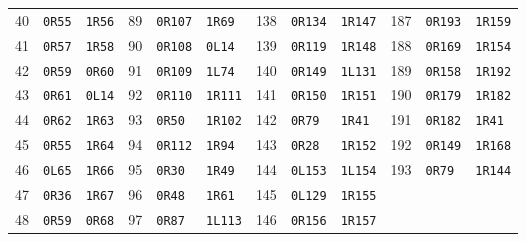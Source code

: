 \begin{center}
\begin{tabular}{@{}rll@{\qquad}rll@{\qquad}rll@{\qquad}rll@{}}
40 & \texttt{0R55} & \texttt{1R56} & 89 & \texttt{0R107} & \texttt{1R69} & 138 & \texttt{0R134} & \texttt{1R147} & 187 & \texttt{0R193} & \texttt{1R159}\\
41 & \texttt{0R57} & \texttt{1R58} & 90 & \texttt{0R108} & \texttt{0L14} & 139 & \texttt{0R119} & \texttt{1R148} & 188 & \texttt{0R169} & \texttt{1R154}\\
42 & \texttt{0R59} & \texttt{0R60} & 91 & \texttt{0R109} & \texttt{1L74} & 140 & \texttt{0R149} & \texttt{1L131} & 189 & \texttt{0R158} & \texttt{1R192}\\
43 & \texttt{0R61} & \texttt{0L14} & 92 & \texttt{0R110} & \texttt{1R111} & 141 & \texttt{0R150} & \texttt{1R151} & 190 & \texttt{0R179} & \texttt{1R182}\\
44 & \texttt{0R62} & \texttt{1R63} & 93 & \texttt{0R50} & \texttt{1R102} & 142 & \texttt{0R79} & \texttt{1R41} & 191 & \texttt{0R182} & \texttt{1R41}\\
45 & \texttt{0R55} & \texttt{1R64} & 94 & \texttt{0R112} & \texttt{1R94} & 143 & \texttt{0R28} & \texttt{1R152} & 192 & \texttt{0R149} & \texttt{1R168}\\
46 & \texttt{0L65} & \texttt{1R66} & 95 & \texttt{0R30} & \texttt{1R49} & 144 & \texttt{0L153} & \texttt{1L154} & 193 & \texttt{0R79} & \texttt{1R144}\\
47 & \texttt{0R36} & \texttt{1R67} & 96 & \texttt{0R48} & \texttt{1R61} & 145 & \texttt{0L129} & \texttt{1R155} &  &  & \\
48 & \texttt{0R59} & \texttt{0R68} & 97 & \texttt{0R87} & \texttt{1L113} & 146 & \texttt{0R156} & \texttt{1R157} &  &  & \\
\bottomrule
\end{tabular}
\end{center}
\endgroup
